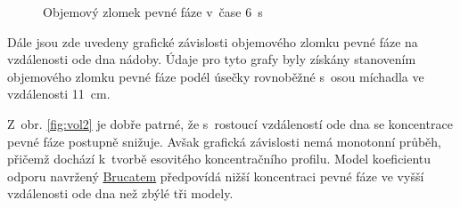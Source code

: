 \begin{figure}[h!]
  \qquad
  \caption{Objemový zlomek pevné fáze v~čase \SI{6}{\second}}
  \label{fig:count6}
\end{figure}

\vspace{-9mm}
\newpage

Dále jsou zde uvedeny grafické závislosti objemového zlomku pevné fáze na vzdálenosti ode dna nádoby. Údaje pro tyto grafy byly získány stanovením objemového zlomku pevné fáze podél úsečky rovnoběžné s~osou míchadla ve vzdálenosti \SI{11}{\centi\metre}.

Z~obr. \ref{fig:vol2} je dobře patrné, že s~rostoucí vzdáleností ode dna se koncentrace pevné fáze postupně snižuje. Avšak grafická závislosti nemá monotonní průběh, přičemž dochází k~tvorbě esovitého koncentračního profilu. Model koeficientu odporu navržený \hyperlink{hyp:cds}{Brucatem} předpovídá nižší koncentraci pevné fáze ve vyšší vzdálenosti ode dna než zbýlé tři modely.     


